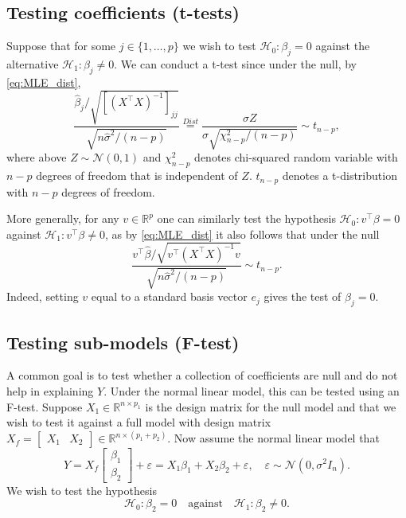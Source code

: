 \subsection{Testing coefficients (t-tests)}

Suppose that for some $j \in \{1,\dots,p \}$ we wish to test $\mathcal{H}_0: \beta_j =0$ against the alternative $\mathcal{H}_1: \beta_j \neq 0$.  We can conduct a t-test since under the null, by \eqref{eq:MLE_dist},
 $$\frac{\hat{\beta}_j/ \sqrt{[(X^\top  X)^{-1}]_{jj}} }{\sqrt{n \hat{\sigma}^2/(n-p)}} \stackrel{Dist}{=} \frac{\sigma Z }{\sigma \sqrt{\chi_{n-p}^2/(n-p)}} \sim t_{n-p},$$ where above $Z \sim \mathcal{N}(0,1)$ and $\chi_{n-p}^2$ denotes chi-squared random variable with $n-p$ degrees of freedom that is independent of $Z$. $t_{n-p}$ denotes a t-distribution with $n-p$ degrees of freedom.

More generally, for any $v \in \mathbb{R}^p$ one can similarly test the hypothesis $\mathcal{H}_0 : v^\top \beta =0$ against $\mathcal{H}_1: v^\top \beta \neq 0$, as by \eqref{eq:MLE_dist} it also follows that under the null $$\frac{v^\top \hat{\beta} /\sqrt{v^\top (X^\top X)^{-1} v} }{\sqrt{n \hat{\sigma}^2/(n-p)}} \sim t_{n-p}.$$
Indeed, setting $v$ equal to a standard basis vector $e_j$ gives the test of $\beta_j = 0$.


\subsection{Testing sub-models (F-test)}\label{sec:F-test}

A common goal is to test whether a collection of coefficients are null and do not help in explaining $Y$. Under the normal linear model, this can be tested using an F-test. Suppose $X_1 \in \mathbb{R}^{n \times p_1}$ is the design matrix for the null model and that we wish to test it against a full model with design matrix $X_f = \begin{bmatrix} X_1 & X_2 \end{bmatrix} \in \mathbb{R}^{n \times (p_1+p_2)}$. Now assume the normal linear model that $$Y= X_f \begin{bmatrix} \beta_1 \\ \beta_2 \end{bmatrix} +\varepsilon =X_1 \beta_1 +X_2 \beta_2 + \varepsilon, \quad \varepsilon \sim \mathcal{N}(0,\sigma^2 I_n).$$ We wish to test the hypothesis $$\mathcal{H}_0: \beta_2 =0 \quad \text {against}  \quad \mathcal{H}_1:  \beta_2 \neq 0.$$ 

